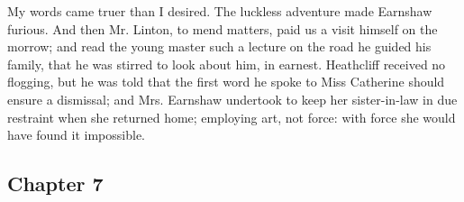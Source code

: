 \par My words came truer than I desired. The luckless adventure made Earnshaw furious. And then Mr. Linton, to mend matters, paid us a visit himself on the morrow; and read the young master such a lecture on the road he guided his family, that he was stirred to look about him, in earnest. Heathcliff received no flogging, but he was told that the first word he spoke to Miss Catherine should ensure a dismissal; and Mrs. Earnshaw undertook to keep her sister-in-law in due restraint when she returned home; employing art, not force: with force she would have found it impossible.









\subsection*{Chapter 7}

